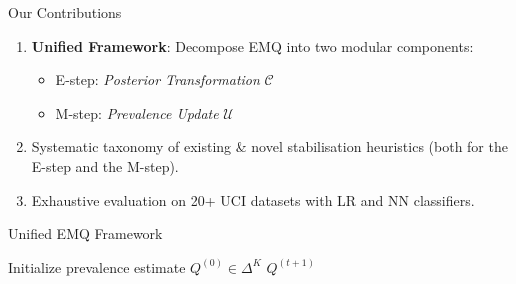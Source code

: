 \documentclass[aspectratio=169]{beamer}
\begin{document}
\begin{frame}{Our Contributions}
  \begin{enumerate}
    \item \textbf{Unified Framework}: Decompose EMQ into two modular components:
          \begin{itemize}
            \item E-step: \textit{Posterior Transformation} $\mathcal{C}$
            \item M-step: \textit{Prevalence Update} $\mathcal{U}$
          \end{itemize}
    \item Systematic taxonomy of existing \& novel stabilisation heuristics (both for the E-step and the M-step).
    \item Exhaustive evaluation on 20+ UCI datasets with LR and NN classifiers.
  \end{enumerate}
\end{frame}

\begin{frame}[fragile]{Unified EMQ Framework}
\fontsize{8.5}{8.5}\selectfont
\begin{algorithm}[H]
\DontPrintSemicolon
\SetAlgoNoLine %
\SetNlSty{}{\color{gray}}{} %
Initialize prevalence estimate $Q^{(0)} \in \Delta^K$\;
\Return $Q^{(t+1)}$\;
\caption{Unified EMQ Framework}
\end{algorithm}
\end{frame}
\end{document}
